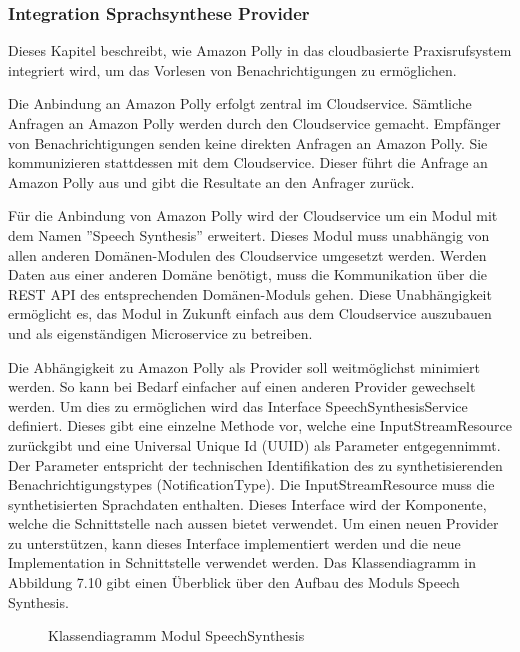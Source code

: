 \clearpage
\subsubsection{Integration Sprachsynthese Provider}

Dieses Kapitel beschreibt, wie Amazon Polly in das cloudbasierte Praxisrufsystem integriert wird, um das Vorlesen von Benachrichtigungen zu ermöglichen.

Die Anbindung an Amazon Polly erfolgt zentral im Cloudservice.
Sämtliche Anfragen an Amazon Polly werden durch den Cloudservice gemacht.
Empfänger von Benachrichtigungen senden keine direkten Anfragen an Amazon Polly.
Sie kommunizieren stattdessen mit dem Cloudservice.
Dieser führt die Anfrage an Amazon Polly aus und gibt die Resultate an den Anfrager zurück.

Für die Anbindung von Amazon Polly wird der Cloudservice um ein Modul mit dem Namen ''Speech Synthesis'' erweitert.
Dieses Modul muss unabhängig von allen anderen Domänen-Modulen des Cloudservice umgesetzt werden.
Werden Daten aus einer anderen Domäne benötigt, muss die Kommunikation über die REST API des entsprechenden Domänen-Moduls gehen.
Diese Unabhängigkeit ermöglicht es, das Modul in Zukunft einfach aus dem Cloudservice auszubauen und als eigenständigen Microservice zu betreiben.

Die Abhängigkeit zu Amazon Polly als Provider soll weitmöglichst minimiert werden.
So kann bei Bedarf einfacher auf einen anderen Provider gewechselt werden.
Um dies zu ermöglichen wird das Interface SpeechSynthesisService definiert.
Dieses gibt eine einzelne Methode vor, welche eine InputStreamResource zurückgibt und eine Universal Unique Id (UUID) als Parameter entgegennimmt.
Der Parameter entspricht der technischen Identifikation des zu synthetisierenden Benachrichtigungstypes (NotificationType).
Die InputStreamResource muss die synthetisierten Sprachdaten enthalten.
Dieses Interface wird der Komponente, welche die Schnittstelle nach aussen bietet verwendet.
Um einen neuen Provider zu unterstützen, kann dieses Interface implementiert werden und die neue Implementation in Schnittstelle verwendet werden.
Das Klassendiagramm in Abbildung 7.10 gibt einen Überblick über den Aufbau des Moduls Speech Synthesis.

\begin{figure}[h]
    \centering
    \begin{minipage}[b]{1\textwidth}
        \caption{Klassendiagramm Modul SpeechSynthesis}
    \end{minipage}
\end{figure}

